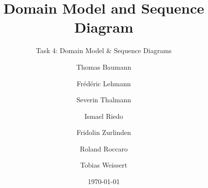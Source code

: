 \subject{Software Engineering and Design - Team Red}
\title{Domain Model and Sequence Diagram}
\subtitle{Task 4: Domain Model \& Sequence Diagrams}
\author{
  Thomas Baumann
  \and
  Frédéric Lehmann
  \and
  Severin Thalmann
  \and
  Ismael Riedo
  \and
  Fridolin Zurlinden
  \and
  Roland Roccaro
  \and
  Tobias Weissert
}
\date{\today}

\maketitle
